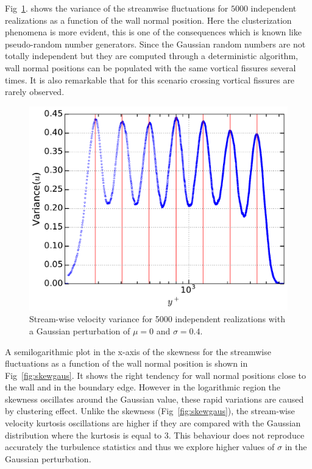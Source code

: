 \documentclass[aps,reprint,amsmath,amssymb,pra]{revtex4-1}%
\begin{document}
Fig~\ref{fig:varigaus}. shows the variance of the streamwise fluctuations for $5000$ independent realizations as a function of the wall normal position. Here the clusterization phenomena is more evident, this is one of the consequences which is known like pseudo-random number generators. Since the Gaussian random numbers are not totally independent but they are computed through a deterministic algorithm, wall normal positions can be populated with the same vortical fissures several times. It is also remarkable that for this scenario crossing vortical fissures are rarely observed. 

\begin{figure}[b]
\includegraphics[scale=0.46]{figures/variance_5000_assembles}
\caption{\label{fig:varigaus} Stream-wise velocity variance for 5000 independent realizations with a Gaussian perturbation of $\mu=0$ and $\sigma=0.4$.}
\end{figure}
A semilogarithmic plot in the x-axis of the skewness for the streamwise fluctuations as a function of the wall normal position is shown in Fig~\ref{fig:skewgaus}. It shows the right tendency for wall normal positions close to the wall and in the boundary edge. However in the logarithmic region the skewness oscillates around the Gaussian value, these
rapid variations are caused by clustering effect. Unlike the skewness (Fig~\ref{fig:skewgaus}), the stream-wise velocity kurtosis oscillations are higher if they are compared with the Gaussian distribution where the kurtosis is equal to 3. This behaviour does not reproduce accurately the turbulence statistics and thus we explore higher values of $\sigma$ in the Gaussian perturbation.\\
\end{document}

